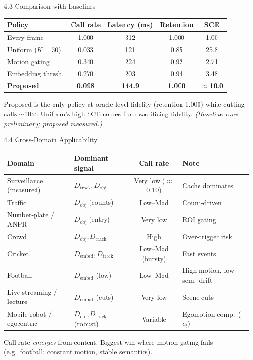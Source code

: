 \documentclass[11pt,aspectratio=169]{beamer}
\begin{document}
\begin{frame}{4.3 Comparison with Baselines}
\centering\small
\begin{tabular}{@{}lcccc@{}}
\toprule
\textbf{Policy} & \textbf{Call rate} & \textbf{Latency (ms)} & \textbf{Retention} & \textbf{SCE}\\
\midrule
Every-frame        & 1.000 & 312 & 1.000 & 1.00\\
Uniform ($K{=}30$) & 0.033 & 121 & 0.85 & 25.8\\
Motion gating      & 0.340 & 224 & 0.92 & 2.71\\
Embedding thresh.  & 0.270 & 203 & 0.94 & 3.48\\
\alert{\textbf{Proposed}} & \alert{\textbf{0.098}} & \alert{\textbf{144.9}} & \alert{\textbf{1.000}} & \alert{$\boldsymbol{\approx}$\textbf{10.0}}\\
\bottomrule
\end{tabular}

\vspace{2mm}
\footnotesize Proposed is the \alert{only} policy at oracle-level fidelity (retention 1.000) while cutting calls $\sim$10$\times$.
Uniform's high SCE comes from sacrificing fidelity. \emph{(Baseline rows preliminary; proposed measured.)}
\end{frame}

\begin{frame}{4.4 Cross-Domain Applicability}
\centering\scriptsize
\begin{tabular}{@{}llcl@{}}
\toprule
\textbf{Domain} & \textbf{Dominant signal} & \textbf{Call rate} & \textbf{Note}\\
\midrule
Surveillance (measured) & $D_{\text{track}},D_{\text{obj}}$ & Very low ($\approx$0.10) & Cache dominates\\
Traffic & $D_{\text{obj}}$ (counts) & Low--Mod & Count-driven\\
Number-plate / ANPR & $D_{\text{obj}}$ (entry) & Very low & ROI gating\\
Crowd & $D_{\text{obj}},D_{\text{track}}$ & High & Over-trigger risk\\
Cricket & $D_{\text{embed}},D_{\text{track}}$ & Low--Mod (bursty) & Fast events\\
Football & $D_{\text{embed}}$ (low) & Low--Mod & \alert{High motion, low sem.\ drift}\\
Live streaming / lecture & $D_{\text{embed}}$ (cuts) & Very low & Scene cuts\\
Mobile robot / egocentric & $D_{\text{obj}},D_{\text{track}}$ (robust) & Variable & Egomotion comp.\ ($c_t$)\\
\bottomrule
\end{tabular}

\vspace{2mm}
\footnotesize Call rate \emph{emerges} from content. Biggest win where motion-gating fails (e.g.\ football: constant motion, stable semantics).
\end{frame}
\end{document}
